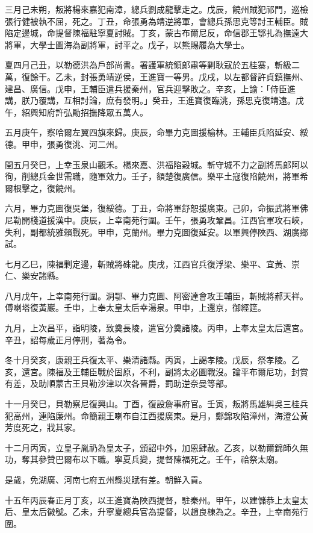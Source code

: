 \begin{pinyinscope}
三月己未朔，叛將楊來嘉犯南漳，總兵劉成龍擊走之。戊辰，饒州賊犯祁門，巡檢張行健被執不屈，死之。丁丑，命張勇為靖逆將軍，會總兵孫思克等討王輔臣。賊陷定邊城，命提督陳福駐寧夏討賊。丁亥，蒙古布爾尼反，命信郡王鄂扎為撫遠大將軍，大學士圖海為副將軍，討平之。戊子，以熊賜履為大學士。

夏四月己丑，以勒德洪為戶部尚書。署護軍統領郎肅等剿耿寇於五桂寨，斬級二萬，復餘干。乙未，封張勇靖逆侯，王進寶一等男。戊戌，以左都督許貞鎮撫州、建昌、廣信。戊申，王輔臣遣兵援秦州，官兵迎擊敗之。辛亥，上諭：「侍臣進講，朕乃覆講，互相討論，庶有發明。」癸丑，王進寶復臨洮，孫思克復靖遠。戊午，紹興知府許弘勛招撫降眾五萬人。

五月庚午，察哈爾左翼四旗來歸。庚辰，命畢力克圖援榆林。王輔臣兵陷延安、綏德。甲申，張勇復洮、河二州。

閏五月癸巳，上幸玉泉山觀禾。楊來嘉、洪福陷穀城。斬守城不力之副將馬郎阿以徇，削總兵金世需職，隨軍效力。壬子，額楚復廣信。樂平土寇復陷饒州，將軍希爾根擊之，復饒州。

六月，畢力克圖復吳堡，復綏德。丁丑，命將軍舒恕援廣東。己卯，命振武將軍佛尼勒開棧道援漢中。庚辰，上幸南苑行圍。壬午，張勇攻鞏昌。江西官軍攻石峽，失利，副都統雅賴戰死。甲申，克蘭州。畢力克圖復延安。以軍興停陜西、湖廣鄉試。

七月乙巳，陳福剿定邊，斬賊將硃龍。庚戌，江西官兵復浮梁、樂平、宜黃、崇仁、樂安諸縣。

八月戊午，上幸南苑行圍。洞鄂、畢力克圖、阿密達會攻王輔臣，斬賊將郝天祥。傅喇塔復黃巖。壬申，上奉太皇太后幸湯泉。甲申，上還京，御經筵。

九月，上次昌平，詣明陵，致奠長陵，遣官分奠諸陵。丙申，上奉太皇太后還宮。辛丑，詔每歲正月停刑，著為令。

冬十月癸亥，康親王兵復太平、樂清諸縣。丙寅，上謁孝陵。戊辰，祭孝陵。乙亥，還宮。陳福及王輔臣戰於固原，不利，副將太必圖戰沒。論平布爾尼功，封賞有差，及助順蒙古王貝勒沙津以次各晉爵，罰助逆奈曼等部。

十一月癸巳，貝勒察尼復興山。丁酉，復設詹事府官。壬寅，叛將馬雄糾吳三桂兵犯高州，連陷廉州。命簡親王喇布自江西援廣東。是月，鄭錦攻陷漳州，海澄公黃芳度死之，戕其家。

十二月丙寅，立皇子胤礽為皇太子，頒詔中外，加恩肆赦。乙亥，以勒爾錦師久無功，奪其參贊巴爾布以下職。寧夏兵變，提督陳福死之。壬午，祫祭太廟。

是歲，免湖廣、河南七府五州縣災賦有差。朝鮮入貢。

十五年丙辰春正月丁亥，以王進寶為陜西提督，駐秦州。甲午，以建儲恭上太皇太后、皇太后徽號。乙未，升寧夏總兵官為提督，以趙良棟為之。辛丑，上幸南苑行圍。


\end{pinyinscope}

